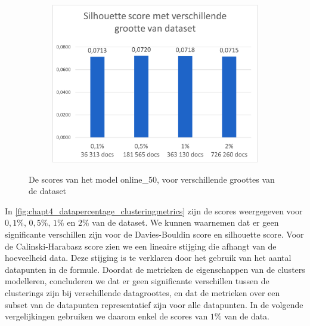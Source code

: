 \begin{figure}[H]
    \centering
    \begin{subfigure}{.5\textwidth}
        \centering
        \includegraphics[width=1\linewidth]{fig/chapt4/NLP/silhouette_data.png}
    \end{subfigure}
    \caption{De scores van het model online\_50, voor verschillende groottes van de dataset}
    \label{fig:chapt4_datapercentage_clusteringmetrics}
\end{figure}

In \autoref{fig:chapt4_datapercentage_clusteringmetrics} zijn de scores weergegeven voor $0,1\%$, $0,5\%$, $1\%$ en $2\%$ van de dataset. We kunnen waarnemen dat er geen significante verschillen zijn voor de Davies-Bouldin score en silhouette score. Voor de Calinski-Harabasz score zien we een lineaire stijging die afhangt van de hoeveelheid data. Deze stijging is te verklaren door het gebruik van het aantal datapunten in de formule. Doordat de metrieken de eigenschappen van de clusters modelleren, concluderen we dat er geen significante verschillen tussen de clusterings zijn bij verschillende datagroottes, en dat de metrieken over een subset van de datapunten representatief zijn voor alle datapunten. In de volgende vergelijkingen gebruiken we daarom enkel de scores van $1\%$ van de data. 

